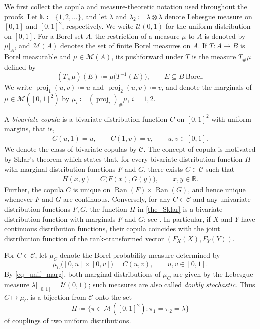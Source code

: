 \documentclass{article}
\newcommand{\CC}{\mathcal{C}}
\newcommand{\lam}{\lambda}
\newcommand{\N}{\mathbb{N}}
\newcommand{\R}{\mathbb{R}}
\newcommand{\cM}{\mathcal{M}}
\newcommand{\cU}{\mathcal{U}}
\begin{document}
We first collect the copula and measure-theoretic notation used throughout the proofs.
Let \(\N\coloneqq\{1,2,\ldots\}\), and let \(\lam\) and \(\lam_2\coloneqq\lam\otimes\lam\) denote Lebesgue measure on \([0,1]\) and \([0,1]^2\), respectively.
We write \(\cU(0,1)\) for the uniform distribution on \([0,1]\).
For a Borel set \(A\), the restriction of a measure \(\mu\) to \(A\) is denoted by \(\mu\vert_A\), and \(\cM(A)\) denotes the set of finite Borel measures on \(A\).
If \(T\colon A\to B\) is Borel measurable and \(\mu\in\cM(A)\), its pushforward under \(T\) is the measure \(T_\#\mu\) defined by
\[
    (T_\#\mu)(E)\coloneqq\mu\bigl(T^{-1}(E)\bigr),
    \qquad E\subseteq B\ \text{Borel}.
\]
We write \(\operatorname{proj}_1(u,v)\coloneqq u\) and \(\operatorname{proj}_2(u,v)\coloneqq v\), and denote the marginals of \(\mu\in\cM([0,1]^2)\) by \(\mu_i\coloneqq(\operatorname{proj}_i)_\#\mu\), \(i=1,2\).

A \emph{bivariate copula} is a bivariate distribution function \(C\) on \([0,1]^2\) with uniform margins, that is,
\begin{align}\label{eq_unif_marg}
    C(u,1)=u,
    \qquad
    C(1,v)=v,
    \qquad u,v\in[0,1].
\end{align}    
We denote the class of bivariate copulas by \(\CC\).
The concept of copula is motivated by Sklar's theorem which states that, for every bivariate distribution function \(H\) with marginal distribution functions \(F\) and \(G\), there exists \(C\in\CC\) such that
\begin{align}\label{the_Sklar}
    H(x,y)=C\bigl(F(x),G(y)\bigr),
    \qquad x,y\in\R.
\end{align}
Further, the copula \(C\) is unique on \(\operatorname{Ran}(F)\times\operatorname{Ran}(G)\), and hence unique whenever \(F\) and \(G\) are continuous.
Conversely, for any \(C\in\CC\) and any univariate distribution functions \(F,G\), the function \(H\) in \eqref{the_Sklar} is a bivariate distribution function with marginals \(F\) and \(G\); see \cite[Thm.~2.3.3]{nelsen2006introduction}.
In particular, if \(X\) and \(Y\) have continuous distribution functions, their copula coincides with the joint distribution function of the rank-transformed vector \((F_X(X),F_Y(Y))\).

For \(C\in\CC\), let \(\mu_C\) denote the Borel probability measure determined by
\[
    \mu_C\bigl([0,u]\times[0,v]\bigr)=C(u,v),
    \qquad u,v\in[0,1].
\]
By \eqref{eq_unif_marg}, both marginal distributions of \(\mu_C\) are given by the Lebesgue measure \(\lambda|_{[0,1]} = \cU(0,1)\); such measures are also called \emph{doubly stochastic}.
Thus \(C\mapsto\mu_C\) is a bijection from \(\CC\) onto the set
\[
    \Pi
    \coloneqq
    \bigl\{
        \pi\in\cM([0,1]^2):
        \pi_1=\pi_2=\lam
    \bigr\}
\]
of couplings of two uniform distributions.
\end{document}

